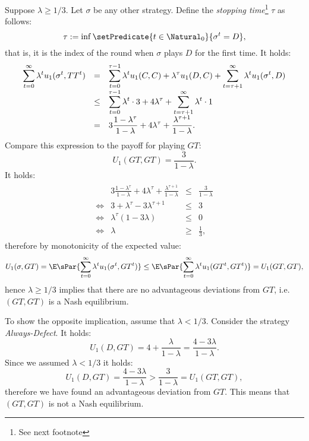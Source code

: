 \documentclass{scrartcl}
\begin{document}
\vspace{0.5em}
 Suppose $\lambda \geq 1/3$. Let $\sigma$ be any 
other strategy. 
Define the \emph{stopping time}\footnote{See next footnote} $\tau$ as follows:
\[
  \tau := \inf\setPredicate{t \in \Natural_0}{\sigma^t = D},
\]
that is, it is the index of the round when $\sigma$ plays $D$ 
for the first time.
It holds:
\begin{align*}
  \begin{array}{>{\displaystyle}rc>{\displaystyle}l}
    \sum_{t=0}^\infty \lambda^t u_1(\sigma^t, TT^t)
     & = & \sum_{t = 0}^{\tau - 1} \lambda^t u_1(C, C) + 
           \lambda^\tau u_1(D, C) + 
           \sum_{t = \tau + 1}^\infty \lambda^t u_1(\sigma^t, D) \\
     & \leq &
       \sum_{t = 0}^{\tau - 1} \lambda^t \cdot 3 + 4 \lambda^\tau + 
       \sum_{t = \tau + 1}^\infty \lambda^t \cdot 1 \\
     & = & 3\frac{1 - \lambda^\tau}{1 - \lambda} + 4\lambda^\tau +
           \frac{\lambda^{\tau + 1}}{1 - \lambda}.
  \end{array}
\end{align*}
Compare this expression to the payoff for playing $GT$:
\[
  U_1(GT, GT) = \frac{3}{1-\lambda}.
\]
It holds:
\begin{align*}
  \begin{array}{crcl}
     & 3\frac{1 - \lambda^\tau}{1 - \lambda} + 4\lambda^\tau +
           \frac{\lambda^{\tau + 1}}{1 - \lambda}
    & \leq & \frac{3}{1-\lambda} \\
     \Leftrightarrow & 
    3 + \lambda^\tau - 3\lambda^{\tau + 1} & \leq  & 3 \\
     \Leftrightarrow &
    \lambda^{\tau}(1 - 3 \lambda) & \leq & 0 \\
     \Leftrightarrow & 
      \lambda & \geq & \frac{1}{3},
  \end{array}
\end{align*}
therefore by monotonicity of the expected value:
\[
  U_1(\sigma, GT) = \E\sPar{\sum_{t=0}^\infty \lambda^t u_1(\sigma^t, GT^t)}
    \leq 
    \E\sPar{\sum_{t=0}^\infty \lambda^t u_1(GT^t, GT^t)}
    = U_1(GT, GT),
\]
hence $\lambda \geq 1/3$ implies that there are no advantageous deviations from
$GT$, i.e. $(GT, GT)$ is a Nash equilibrium.

To show the opposite implication, assume that $\lambda < 1/3$.
Consider the strategy \emph{Always-Defect}. It holds:
\[
  U_1(D, GT) = 4 + \frac{\lambda}{1-\lambda} = \frac{4-3\lambda}{1-\lambda}.
\]
Since we assumed $\lambda < 1/3$ it holds:
\[
  U_1(D, GT) = \frac{4 - 3\lambda}{1-\lambda} > \frac{3}{1-\lambda} 
             = U_1(GT, GT),
\]
therefore we have found an advantageous deviation from $GT$. This means that
$(GT, GT)$ is not a Nash equilibrium. 
\end{document}
